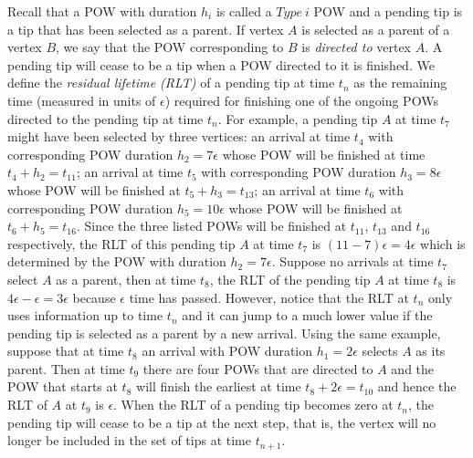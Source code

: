 \documentclass[12pt]{article}
\numberwithin{equation}{section}  %
\begin{document}
Recall that a POW with duration $h_i$ is called a {$Type\ i$} POW and a pending tip is a tip that has been selected as a parent. If vertex $A$ is selected as a parent of a vertex $B$, we say that the POW corresponding to $B$ is \textit{directed to} vertex $A$. A pending tip will cease to be a tip when a POW directed to it is finished. We define the {\em residual lifetime (RLT)} of a pending tip at time $t_n$ as the remaining time (measured in units of $\epsilon$) required for finishing one of the ongoing POWs directed to the pending tip at time $t_n$. For example, a pending tip $A$ at time $t_7$ might have been selected by three vertices: an arrival at time $t_4$ with corresponding POW duration $h_2=7\epsilon$ whose POW will be finished at time $t_4+h_2=t_{11}$; an arrival at time $t_5$ with corresponding POW duration $h_3=8\epsilon$ whose POW will be finished at $t_5+h_3=t_{13}$; an arrival at time $t_6$ with corresponding POW duration $h_5=10\epsilon$ whose POW will be finished at $t_6+h_5=t_{16}$. Since the three listed POWs will be finished at $t_{11}$, $t_{13}$ and $t_{16}$ respectively, the RLT of this pending tip $A$ at time $t_7$ is $(11-7)\epsilon=4\epsilon$ which is determined by the POW with duration $h_2=7\epsilon$. Suppose no arrivals at time $t_7$ select $A$ as a parent, then at time $t_8$, the RLT of the pending tip $A$ at time $t_8$ is $4\epsilon-\epsilon=3\epsilon$ because $\epsilon$ time has passed. However, notice that the RLT at $t_n$ only uses information up to time $t_n$ and it can jump to a much lower value if the pending tip is selected as a parent by a new arrival. Using the same example, suppose that at time $t_8$ an arrival with POW duration $h_1=2\epsilon$ selects $A$ as its parent. Then at time $t_9$ there are four POWs that are directed to $A$ and the POW that starts at $t_8$ will finish the earliest at time $t_8+2\epsilon=t_{10}$ and hence the RLT of $A$ at $t_9$ is $\epsilon$. When the RLT of a pending tip becomes zero at $t_n$, the pending tip will cease to be a tip at the next step, that is, the vertex will no longer be included in the set of tips at time $t_{n+1}$.
\end{document}
